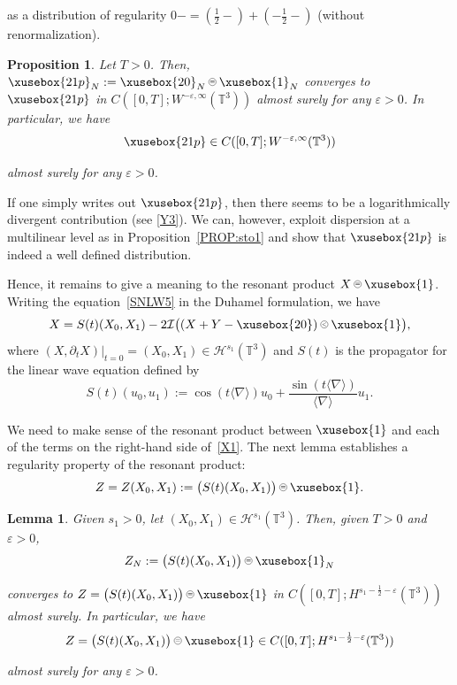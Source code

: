 \documentclass[%
11pt,  reqno]{amsart}
\def\<#1>{\xusebox{#1}}
\newcommand{\pe}{\mathbin{\scaleobj{0.7}{\tikz \draw (0,0) node[shape=circle,draw,inner sep=0pt,minimum size=8.5pt] {\scriptsize  $=$};}}}
\newcommand{\pl}{\mathbin{\scaleobj{0.7}{\tikz \draw (0,0) node[shape=circle,draw,inner sep=0pt,minimum size=8.5pt] {\scriptsize $<$};}}}
\newtheorem{lemma}[theorem]{Lemma}
\newtheorem{proposition}[theorem]{Proposition}
\newcommand{\1}{\hspace{0.2mm}\text{I}\hspace{0.2mm}}
\newcommand{\noi}{\noindent}
\newcommand{\T}{\mathbb{T}}
\newcommand{\nb}{\nabla}
\newcommand{\eps}{\varepsilon}
\newcommand{\dt}{\partial_t}
\newcommand{\jb}[1]
{\langle #1 \rangle}
\renewcommand{\H}{\mathcal{H}}
\newcommand{\I}{\mathcal{I}}
\numberwithin{equation}{section}
\numberwithin{theorem}{section}
\begin{document}
\noi
as a distribution of regularity $0- = (\frac{1}{2}-) + (-\frac 12 -)$
(without renormalization).


\begin{proposition}\label{PROP:sto2}
Let   $T >0$.
Then, 
$\<21p>_N := \<20>_N\pe \<1>_N$
 converges to $\<21p>$
 in 
$C([0,T];W^{ -\eps,\infty}(\T^3))$
almost surely
for any  $\eps > 0$.
 In particular, we have
  \[\<21p> \in C([0,T];W^{ -\eps,\infty}(\T^3))\]
  
  \noi
  almost surely  for any  $\eps > 0$.
\end{proposition}


If one simply writes out  $\<21p>$,  
then there seems to be a logarithmically divergent contribution
(see \eqref{Y3}).
We can, however, exploit dispersion at a multilinear level
as in Proposition~\ref{PROP:sto1}
and show that  $\<21p>$ is indeed a well defined distribution.




Hence, it remains to give a meaning
to the resonant product $X\pe \<1>$.
Writing 
the equation~\eqref{SNLW5}
in the Duhamel formulation, 
we have
\begin{align}
 X  = S(t) (X_0, X_1) -2\I \big((X+Y-\<20>)\pl \<1>\big),
\label{X1}
 \end{align}
\noi
where $(X, \dt X )|_{t = 0} = (X_0, X_1) \in \H^{s_1}(\T^3)$ and $S(t)$ is the propagator for the linear wave equation
defined by 
\begin{equation*}
S(t)(u_0, u_1) := \cos(t\jb{\nb})u_0+\frac{\sin (t\jb{\nb})}{\jb{\nb}}u_1.
\end{equation*}

We need to make sense of  the  resonant product between $\<1>$
and each of the terms on the right-hand side of~\eqref{X1}.
The next lemma establishes a regularity property of 
  the resonant product: 
\begin{align*}
Z =Z(X_0, X_1):= \big(S(t) (X_0,   X_1)\big) \pe \<1>.
\end{align*}



\begin{lemma}\label{LEM:IV}
Given   $s_1 > 0$, %
let  $(X_0, X_1) \in \H^{s_1}(\T^3)$.
Then, 
given  $T >0$  and $\eps > 0$,
\begin{align*}
Z_N := \big(S(t) (X_0,   X_1)\big) \pe \<1>_N
\end{align*}

\noi
 converges to $Z = \big(S(t) (X_0,   X_1)\big) \pe \<1>$
 in $C([0,T];H^{ s_1 - \frac 12 -\eps}(\T^3))$ almost surely.
 In particular, we have
\begin{align*}
Z = \big(S(t) (X_0,   X_1)\big) \pe \<1> \in C([0,T];H^{ s_1 - \frac 12 -\eps}(\T^3))
\end{align*}

\noi
  almost surely  for any  $\eps > 0$.


\end{lemma}
\end{document}
